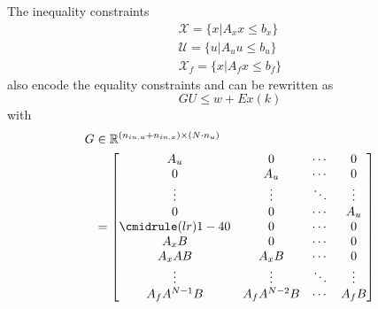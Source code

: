 The inequality constraints
\begin{gather*}
    \mathcal{X} = \{x|A_x x \leq b_x\} \\
    \mathcal{U} = \{u|A_u u \leq b_u\} \\
    \mathcal{X}_f = \{x|A_f x \leq b_f\}
\end{gather*}
also encode the equality constraints and can be rewritten as
\begin{equation*}
    GU\leq w + Ex(k)
\end{equation*}
with
\begin{align*}
    G & \in \mathbb{R}^{(n_{in,u} + n_{in,x})\times (N\cdot n_u)} \\
      & = \begin{bmatrix}
              A_u                   & 0             & \cdots & 0      \\
              0                     & A_u           & \cdots & 0      \\
              \vdots                & \vdots        & \ddots & \vdots \\
              0                     & 0             & \cdots & A_u    \\
              \cmidrule(lr){1-4}  0 & 0             & \cdots & 0      \\
              A_x B                 & 0             & \cdots & 0      \\
              A_x AB                & A_x B         & \cdots & 0      \\
              \vdots                & \vdots        & \ddots & \vdots \\
              A_f A^{N-1} B         & A_f A^{N-2} B & \cdots & A_f B
          \end{bmatrix}
\end{align*}

